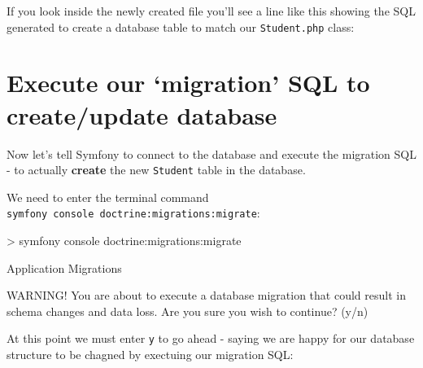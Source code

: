 \documentclass[a4paperpaper,openright]{book}
\newenvironment{Shaded}{}{}
\newcommand{\ExtensionTok}[1]{#1}
\newcommand{\KeywordTok}[1]{\textcolor[rgb]{0.00,0.44,0.13}{\textbf{#1}}}
\newcommand{\NormalTok}[1]{#1}
\newcommand{\OperatorTok}[1]{\textcolor[rgb]{0.40,0.40,0.40}{#1}}
\newcommand{\OtherTok}[1]{\textcolor[rgb]{0.00,0.44,0.13}{#1}}
\newcommand{\StringTok}[1]{\textcolor[rgb]{0.25,0.44,0.63}{#1}}
\begin{document}
If you look inside the newly created file you'll see a line like this
showing the SQL generated to create a database table to match our
\texttt{Student.php} class:

\begin{Shaded}
\end{Shaded}

\hypertarget{execute-our-migration-sql-to-createupdate-database}{%
\section{Execute our `migration' SQL to create/update
database}\label{execute-our-migration-sql-to-createupdate-database}}

Now let's tell Symfony to connect to the database and execute the
migration SQL - to actually \textbf{create} the new \texttt{Student}
table in the database.

We need to enter the terminal command
\texttt{symfony\ console\ doctrine:migrations:migrate}:

\begin{Shaded}
\begin{Highlighting}[]
    \OperatorTok{>} \ExtensionTok{symfony}\NormalTok{ console doctrine:migrations:migrate}
                                                                  
        \ExtensionTok{Application}\NormalTok{ Migrations                    }
                                                                  
    \ExtensionTok{WARNING}\NormalTok{! You are about to execute a database migration that could result in schema changes and data loss. }
    \ExtensionTok{Are}\NormalTok{ you sure you wish to continue? (y/n)}
\end{Highlighting}
\end{Shaded}

At this point we must enter \texttt{y} to go ahead - saying we are happy
for our database structure to be chagned by exectuing our migration SQL:
\end{document}
